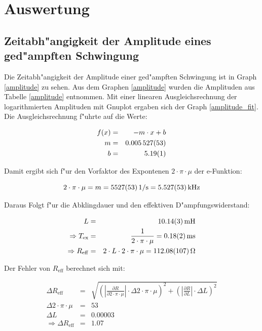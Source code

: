 \section{Auswertung}
	\label{sec:auswertung}

	\subsection{Zeitabh"angigkeit der Amplitude eines ged"ampften Schwingung} %
	\label{sub:zeitabh"angigkeit_der_amplitude_eines_ged"ampften_schwingung}
	
	Die Zeitabh"angigkeit der Amplitude einer ged"ampften Schwingung ist in Graph \eqref{amplitude} zu sehen.
	Aus dem Graphen \eqref{amplitude} wurden die Amplituden aus Tabelle \eqref{amplitude} entnommen. Mit einer linearen Ausgleichsrechnung der logarithmierten  Amplituden mit Gnuplot ergaben sich der Graph \eqref{amplitude_fit}. Die Ausgleichsrechnung f"uhrte auf die Werte:

	\begin{eqnarray}
		f(x) &=& -m \cdot x + b\\ \label{ausgleich}
		m &=& \SI{0.005527 (53)}{} \nonumber\\
		b &=& \SI{5.19 (1)}{}\nonumber 
	\end{eqnarray}

	Damit ergibt sich f"ur den Vorfaktor des Expontenen $2 \cdot \pi \cdot \mu$ der e-Funktion: 
	
	\begin{equation*}
		2\cdot \pi \cdot \mu  = m = \SI{5527 (53)}{1\per\second} = \SI{5.527 (53)}{\kilo\hertz}
	\end{equation*}

	Daraus Folgt f"ur die Abklingdauer und den effektiven D"ampfungswiderstand:

	\begin{eqnarray*}
		L &=& \SI{10.14 (3)}{\milli \henry }\\
		\Rightarrow T_\mathrm{ex} &=& \frac{1}{2 \cdot \pi \cdot \mu} = \SI{0.18 (2)}{\milli \second}\\
		\Rightarrow R_\mathrm{eff} &=& 2 \cdot L \cdot 2 \cdot \pi \cdot \mu = \SI{112.08 (107)}{\ohm}
	\end{eqnarray*}
	\newpage

	Der Fehler von $R_\mathrm{eff}$ berechnet sich mit:

	\begin{eqnarray*}
		\Delta R_\mathrm{eff} &=& \sqrt{ \left( |\frac{\partial R}{\partial 2 \cdot \pi \cdot \mu}| \cdot \Delta 2 \cdot \pi \cdot \mu \right)^2 + \left( |\frac{\partial R}{\partial L}| \cdot \Delta L \right)^2}\\ \label{fehler}
		\Delta 2 \cdot \pi \cdot \mu &=& 53\\
		\Delta L &=& 0.00003\\
		\Rightarrow \Delta R_\mathrm{eff} &=& 1.07
	\end{eqnarray*}

